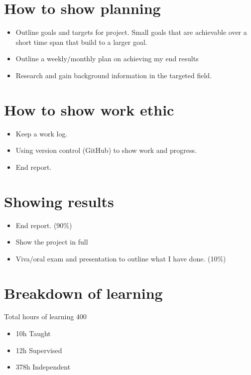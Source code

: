 \section{How to show planning}\label{how-to-show-planning}

\begin{itemize}
\item
  Outline goals and targets for project. Small goals that are achievable
  over a short time span that build to a larger goal.
\item
  Outline a weekly/monthly plan on achieving my end results
\item
  Research and gain background information in the targeted field.
\end{itemize}

\section{How to show work ethic}\label{how-to-show-work-ethic}

\begin{itemize}
\tightlist
\item
  Keep a work log.
\item
  Using version control (GitHub) to show work and progress.
\item
  End report.
\end{itemize}

\section{Showing results}\label{showing-results}

\begin{itemize}
\tightlist
\item
  End report. (90\%)
\item
  Show the project in full
\item
  Viva/oral exam and presentation to outline what I have done. (10\%)
\end{itemize}

\section{Breakdown of learning}\label{breakdown-of-learning}

Total hours of learning 400

\begin{itemize}
\tightlist
\item
  10h Taught
\item
  12h Supervised
\item
  378h Independent
\end{itemize}

